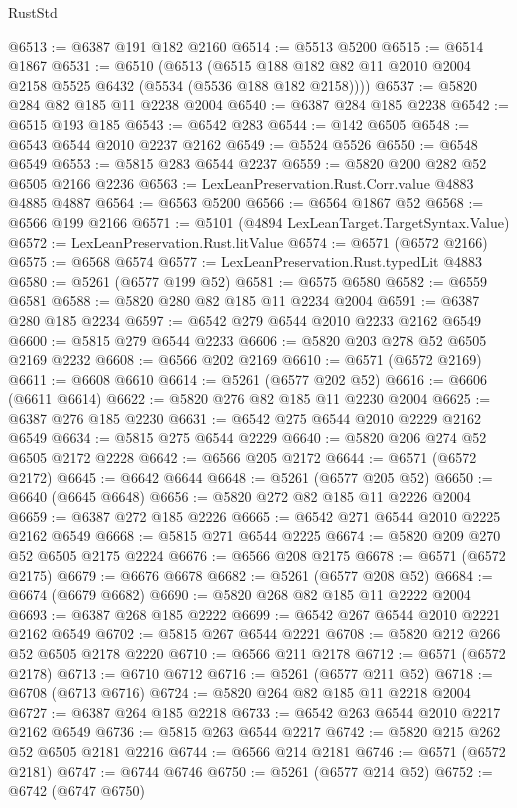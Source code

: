 \begin{lexlean}{RustStd}
\begin{coremodule}
@6513 := @6387 @191 @182 @2160
@6514 := @5513 @5200
@6515 := @6514 @1867
@6531 := @6510
    (@6513 (@6515 @188 @182 @82 @11 @2010 @2004 @2158 @5525 @6432 (@5534 (@5536 @188 @182 @2158))))
@6537 := @5820 @284 @82 @185 @11 @2238 @2004
@6540 := @6387 @284 @185 @2238
@6542 := @6515 @193 @185
@6543 := @6542 @283
@6544 := @142 @6505
@6548 := @6543 @6544 @2010 @2237 @2162
@6549 := @5524 @5526
@6550 := @6548 @6549
@6553 := @5815 @283 @6544 @2237
@6559 := @5820 @200 @282 @52 @6505 @2166 @2236
@6563 := LexLeanPreservation.Rust.Corr.value @4883 @4885 @4887
@6564 := @6563 @5200
@6566 := @6564 @1867 @52
@6568 := @6566 @199 @2166
@6571 := @5101 (@4894 LexLeanTarget.TargetSyntax.Value)
@6572 := LexLeanPreservation.Rust.litValue
@6574 := @6571 (@6572 @2166)
@6575 := @6568 @6574
@6577 := LexLeanPreservation.Rust.typedLit @4883
@6580 := @5261 (@6577 @199 @52)
@6581 := @6575 @6580
@6582 := @6559 @6581
@6588 := @5820 @280 @82 @185 @11 @2234 @2004
@6591 := @6387 @280 @185 @2234
@6597 := @6542 @279 @6544 @2010 @2233 @2162 @6549
@6600 := @5815 @279 @6544 @2233
@6606 := @5820 @203 @278 @52 @6505 @2169 @2232
@6608 := @6566 @202 @2169
@6610 := @6571 (@6572 @2169)
@6611 := @6608 @6610
@6614 := @5261 (@6577 @202 @52)
@6616 := @6606 (@6611 @6614)
@6622 := @5820 @276 @82 @185 @11 @2230 @2004
@6625 := @6387 @276 @185 @2230
@6631 := @6542 @275 @6544 @2010 @2229 @2162 @6549
@6634 := @5815 @275 @6544 @2229
@6640 := @5820 @206 @274 @52 @6505 @2172 @2228
@6642 := @6566 @205 @2172
@6644 := @6571 (@6572 @2172)
@6645 := @6642 @6644
@6648 := @5261 (@6577 @205 @52)
@6650 := @6640 (@6645 @6648)
@6656 := @5820 @272 @82 @185 @11 @2226 @2004
@6659 := @6387 @272 @185 @2226
@6665 := @6542 @271 @6544 @2010 @2225 @2162 @6549
@6668 := @5815 @271 @6544 @2225
@6674 := @5820 @209 @270 @52 @6505 @2175 @2224
@6676 := @6566 @208 @2175
@6678 := @6571 (@6572 @2175)
@6679 := @6676 @6678
@6682 := @5261 (@6577 @208 @52)
@6684 := @6674 (@6679 @6682)
@6690 := @5820 @268 @82 @185 @11 @2222 @2004
@6693 := @6387 @268 @185 @2222
@6699 := @6542 @267 @6544 @2010 @2221 @2162 @6549
@6702 := @5815 @267 @6544 @2221
@6708 := @5820 @212 @266 @52 @6505 @2178 @2220
@6710 := @6566 @211 @2178
@6712 := @6571 (@6572 @2178)
@6713 := @6710 @6712
@6716 := @5261 (@6577 @211 @52)
@6718 := @6708 (@6713 @6716)
@6724 := @5820 @264 @82 @185 @11 @2218 @2004
@6727 := @6387 @264 @185 @2218
@6733 := @6542 @263 @6544 @2010 @2217 @2162 @6549
@6736 := @5815 @263 @6544 @2217
@6742 := @5820 @215 @262 @52 @6505 @2181 @2216
@6744 := @6566 @214 @2181
@6746 := @6571 (@6572 @2181)
@6747 := @6744 @6746
@6750 := @5261 (@6577 @214 @52)
@6752 := @6742 (@6747 @6750)

\end{coremodule}
\end{lexlean}
